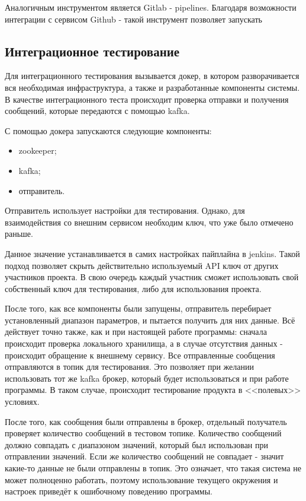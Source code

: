 Аналогичным инструментом является Gitlab - pipelines.
Благодаря возможности интеграции с сервисом Github - такой инструмент позволяет запускать 

\subsection{Интеграционное тестирование}

Для интеграционного тестирования вызывается докер, в котором разворачивается вся необходимая инфраструктура, а также и разработанные компоненты системы.
В качестве интеграционного теста происходит проверка отправки и получения сообщений, которые передаются с помощью kafka.

С помощью докера запускаются следующие компоненты:
\begin{itemize}
    \item zookeeper;
    \item kafka;
    \item отправитель.
\end{itemize}

Отправитель использует настройки для тестирования.
Однако, для взаимодействия со внешним сервисом необходим ключ, что уже было отмечено раньше.

Данное значение устанавливается в самих настройках пайплайна в jenkins.
Такой подход позволяет скрыть действительно используемый API ключ от других участников проекта.
В свою очередь каждый участник сможет использовать свой собственный ключ для тестирования, либо для использования проекта.

После того, как все компоненты были запущены, отправитель перебирает установленный диапазон параметров, и пытается получить для них данные.
Всё действует точно также, как и при настоящей работе программы: сначала происходит проверка локального хранилища, а в случае отсутствия данных - происходит обращение к внешнему сервису.
Все отправленные сообщения отправляются в топик для тестирования.
Это позволяет при желании использовать тот же kafka брокер, который будет использоваться и при работе программы.
В таком случае, происходит тестирование продукта в <<полевых>> условиях.

После того, как сообщения были отправлены в брокер, отдельный получатель проверяет количество сообщений в тестовом топике.
Количество сообщений должно совпадать с диапазоном значений, который был использован при отправлении значений.
Если же количество сообщений не совпадает - значит какие-то данные не были отправлены в топик.
Это означает, что такая система не может полноценно работать, поэтому использование текущего окружения и настроек приведёт к ошибочному поведению программы.

